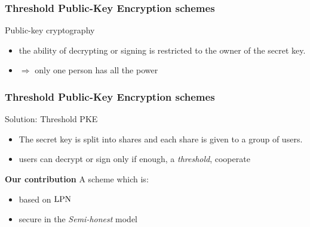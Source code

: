 \begin{frame}
\frametitle{Threshold Public-Key Encryption schemes}

\begin{center}\end{center}

\begin{block}{Public-key cryptography}  
  \begin{itemize}
   \item<1-> the ability of decrypting or signing is restricted to the owner of the secret key.
   \item<2-> $\Rightarrow$ \alert{only one person has all the power} 
  \end{itemize}  
 \end{block}
 \end{frame}
 

 \begin{frame}
 \frametitle{Threshold Public-Key Encryption schemes}
 \begin{block}{Solution: Threshold PKE}
 \begin{itemize}[<+->]
  \item The secret key is split into shares and each share is given to a group of users.
  \item users can decrypt or sign only if enough, a \emph{threshold}, cooperate
  \end{itemize}  
 \end{block}
 
 \begin{block}{\textbf{Our contribution}}
 A {\color{red}{Threshold Public-Key Encryption}} scheme which is:
 \begin{itemize}
   \item<4-> based on $\mathrm{LPN}$
   \item<5-> secure in the \emph{Semi-honest} model
  \end{itemize}

 \end{block}

\end{frame}

